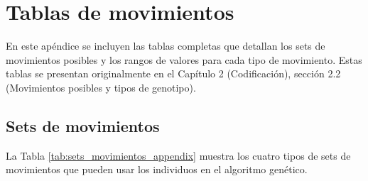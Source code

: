 \documentclass[11pt,spanish,listoffigures,listoftables]{tfgetsinf}
\begin{document}

\APPENDIX

\chapter{Tablas de movimientos}
\label{appendix:movimientos}

En este apéndice se incluyen las tablas completas que detallan los sets de movimientos posibles y los rangos de valores para cada tipo de movimiento. Estas tablas se presentan originalmente en el Capítulo 2 (Codificación), sección 2.2 (Movimientos posibles y tipos de genotipo).

\section{Sets de movimientos}

La Tabla \ref{tab:sets_movimientos_appendix} muestra los cuatro tipos de sets de movimientos que pueden usar los individuos en el algoritmo genético.
\end{document}

